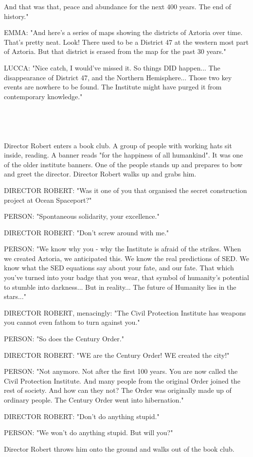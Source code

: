 \documentclass[11pt]{article}
\begin{document}
And that was that, peace and abundance for the next 400 years. 
The end of history."

EMMA: "And here's a series of maps showing the districts of Aztoria over time. 
That's pretty neat.
Look! There used to be a District 47 at the western most part of Aztoria.
But that district is erased from the map for the past 30 years."

LUCCA: "Nice catch, I would've missed it. 
So things DID happen...
The disappearance of District 47, and the Northern Hemisphere...
Those two key events are nowhere to be found.
The Institute might have purged it from contemporary knowledge."

\ 

\ 

Director Robert enters a book club.
A group of people with working hats sit inside, reading.
A banner reads "for the happiness of all humankind". 
It was one of the older institute banners.
One of the people stands up and prepares to bow and greet the director.
Director Robert walks up and grabs him.

DIRECTOR ROBERT: "Was it one of you that organised the secret construction project at Ocean Spaceport?"

PERSON: "Spontaneous solidarity, your excellence."

DIRECTOR ROBERT: "Don't screw around with me."

PERSON: "We know why you - why the Institute is afraid of the strikes.
When we created Aztoria, we anticipated this. 
We know the real predictions of SED.
We know what the SED equations say about your fate, and our fate.
That which you've turned into your badge that you wear, that symbol of humanity's potential to stumble into darkness...
But in reality... The future of Humanity lies in the stars..."

DIRECTOR ROBERT, menacingly: "The Civil Protection Institute has weapons you cannot even fathom to turn against you."

PERSON: "So does the Century Order."

DIRECTOR ROBERT: "WE are the Century Order! 
WE created the city!"

PERSON: "Not anymore. Not after the first 100 years.
You are now called the Civil Protection Institute.
And many people from the original Order joined the rest of society.
And how can they not? 
The Order was originally made up of ordinary people.
The Century Order went into hibernation."

DIRECTOR ROBERT: "Don't do anything stupid."

PERSON: "We won't do anything stupid.
But will you?"

Director Robert throws him onto the ground and walks out of the book club.
\end{document}
